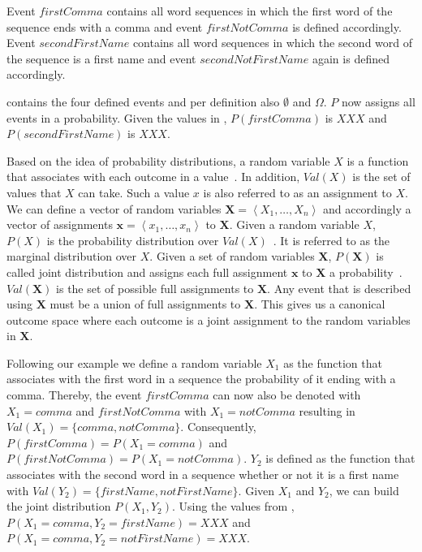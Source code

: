 Event $firstComma$ contains all word sequences in which the first word of the sequence ends with a comma and event $firstNotComma$ is defined accordingly.
Event $secondFirstName$ contains all word sequences in which the second word of the sequence is a first name and event $secondNotFirstName$ again is defined accordingly.

 contains the four defined events and per definition also $\emptyset$ and $\Omega$.
$P$ now assigns all events in  a probability.
Given the values in , $P(firstComma)$ is $XXX$ and $P(secondFirstName)$ is $XXX$.

\bigskip

Based on the idea of \glspl{probability distribution}, a \gls{random variable} $X$ is a \gls{function} that associates with each outcome in  a value~\cite{koller2009probabilistic}.
In addition, $Val(X)$ is the set of values that $X$ can take.
Such a value $x$ is also referred to as an assignment to $X$.
We can define a vector of \glspl{random variable} $\mathbf{X}=\left\langle X_1,\dots,X_n\right\rangle$ and accordingly a vector of assignments $\mathbf{x}=\left\langle x_1,\dots,x_n\right\rangle$ to $\mathbf{X}$.
Given a \gls{random variable} $X$, $P(X)$ is the \gls{probability distribution} over $Val(X)$~\cite{koller2009probabilistic}.
It is referred to as the \gls{marginal distribution} over $X$.
Given a set of \glspl{random variable} $\mathbf{X}$, $P(\mathbf{X})$ is called \gls{joint distribution} and assigns each \gls{full assignment} $\mathbf{x}$ to $\mathbf{X}$ a probability~\cite{koller2009probabilistic}.
$Val(\bm{X})$ is the set of possible \glspl{full assignment} to $\mathbf{X}$.
Any \gls{event} that is described using $\mathbf{X}$ must be a union of \glspl{full assignment} to $\mathbf{X}$.
This gives us a \gls{canonical outcome space} where each outcome is a joint assignment to the \glspl{random variable} in $\mathbf{X}$.

Following our example we define a \gls{random variable} $X_1$ as the \gls{function} that associates with the first word in a sequence the probability of it ending with a comma.
Thereby, the \gls{event} $firstComma$ can now also be denoted with $X_1 = comma$ and $firstNotComma$ with $X_1 = notComma$ resulting in $Val(X_1)=\{comma, notComma\}$.
Consequently, $P(firstComma)=P(X_1{=}comma)$ and $P(firstNotComma)=P(X_1{=}notComma)$.
$Y_2$ is defined as the function that associates with the second word in a sequence whether or not it is a first name with $Val(Y_2)=\{firstName, notFirstName\}$.
Given $X_1$ and $Y_2$, we can build the \gls{joint distribution} $P(X_1,Y_2)$.
Using the values from , $P(X_1{=}comma,Y_2{=}firstName)=XXX$ and $P(X_1{=}comma,Y_2{=}notFirstName)=XXX$.

